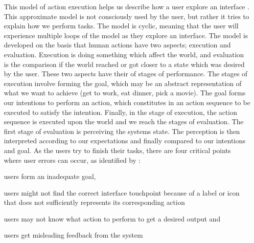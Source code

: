 This model of action execution helps us describe how a user explore an interface \cite{Polson1990}. This approximate model \cite{Norman2013a} is not consciously used by the user, but rather it tries to explain how we perform tasks. The model is cyclic, meaning that the user will experience multiple loops of the model as they explore an interface. The model is developed on the basis that human actions have two aspects; execution and evaluation. Execution is doing something which affect the world, and evaluation is the comparison if the world reached or got closer to a state which was desired by the user. These two aspects have their of stages of performance. The stages of execution involve forming the goal, which may be an abstract representation of what we want to achieve (get to work, eat dinner, pick a movie). The goal forms our intentions to perform an action, which constitutes in an action sequence to be executed to satisfy the intention. Finally, in the stage of execution, the action sequence is executed upon the world and we reach the stages of evaluation. The first stage of evaluation is perceiving the systems state. The perception is then interpreted according to our expectations and finally compared to our intentions and goal. As the users try to finish their tasks, there are four critical points where user errors can occur, as identified by \cite{Shneiderman2004}:
\begin{enumerate*}[label=(\(\arabic*\))]
  \item users form an inadequate goal,
  \item users might not find the correct interface touchpoint because of a label or icon that does not sufficiently represents its corresponding action
  \item users may not know what action to perform to get a desired output and
  \item users get misleading feedback from the system
\end{enumerate*}

